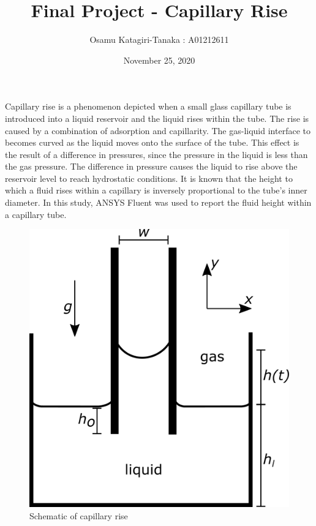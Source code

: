 \documentclass{article}
\title{Final Project - Capillary Rise}
\author{Osamu Katagiri-Tanaka : A01212611}
\date{November 25, 2020} %
\begin{document}
\maketitle


Capillary rise is a phenomenon depicted when a small glass capillary tube is introduced into a liquid reservoir and the liquid rises within the tube. The rise is caused by a combination of adsorption and capillarity. \cite{Zhmud2000} The gas-liquid interface to becomes curved as the liquid moves onto the surface of the tube. This effect is the result of a difference in pressures, since the pressure in the liquid is less than the gas pressure. The difference in pressure causes the liquid to rise above the reservoir level to reach hydrostatic conditions. \cite{Zhmud2000} It is known that the height to which a fluid rises within a capillary is inversely proportional to the tube's inner diameter. In this study, ANSYS Fluent was used to report the fluid height within a capillary tube. \cite{Zhmud2000}

\begin{figure}[h!]
	\centering
	\includegraphics[scale=0.5]{./schematic.png}
	\caption{Schematic of capillary rise}
	\label{img:schematic}
\end{figure}
\end{document}
